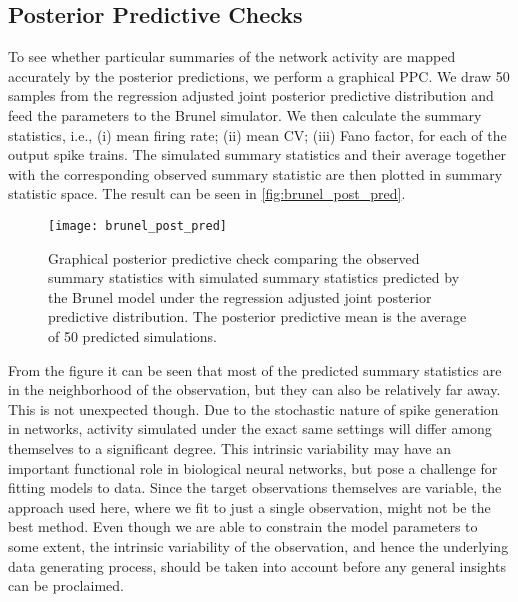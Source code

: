 \subsection{Posterior Predictive Checks}

To see whether particular summaries of the network activity are mapped accurately by the posterior predictions, we perform a graphical PPC. We draw 50 samples from the regression adjusted joint posterior predictive distribution and feed the parameters to the Brunel simulator. We then calculate the summary statistics, i.e., (i) mean firing rate; (ii) mean CV; (iii) Fano factor, for each of the output spike trains. The simulated summary statistics and their average together with the corresponding observed summary statistic are then plotted in summary statistic space. The result can be seen in \autoref{fig:brunel_post_pred}.
\begin{figure}[!htb]
    \centering
    \texttt{[image: brunel\_post\_pred]}
    \caption{Graphical posterior predictive check comparing the observed summary statistics with simulated summary statistics predicted by the Brunel model under the regression adjusted joint posterior predictive distribution. The posterior predictive mean is the average of 50 predicted simulations.
    }
    \label{fig:brunel_post_pred}
\end{figure}
From the figure it can be seen that most of the predicted summary statistics are in the neighborhood of the observation, but they can also be relatively far away. This is not unexpected though. Due to the stochastic nature of spike generation in networks, activity simulated under the exact same settings will differ among themselves to a significant degree. This intrinsic variability may have an important functional role in biological neural networks, but pose a challenge for fitting models to data. Since the target observations themselves are variable, the approach used here, where we fit to just a single observation, might not be the best method. Even though we are able to constrain the model parameters to some extent, the intrinsic variability of the observation, and hence the underlying data generating process, should be taken into account before any general insights can be proclaimed. 





